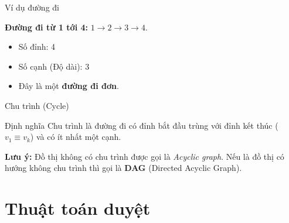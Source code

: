 \documentclass{beamer}
\begin{document}
\begin{frame}{Ví dụ đường đi}

\begin{center}

\end{center}

\pause
\textbf{Đường đi từ 1 tới 4:} $1 \to 2 \to 3 \to 4$.
\begin{itemize}
    \item Số đỉnh: 4
    \item Số cạnh (Độ dài): 3
    \item Đây là một \textbf{đường đi đơn}.
\end{itemize}

\end{frame}


\begin{frame}{Chu trình (Cycle)}

\begin{block}{Định nghĩa}
Chu trình là đường đi có đỉnh bắt đầu trùng với đỉnh kết thúc ($v_1 \equiv v_k$) và có ít nhất một cạnh.
\end{block}

\pause

\begin{center}

\end{center}

\textbf{Lưu ý:} Đồ thị không có chu trình được gọi là \textit{Acyclic graph}. Nếu là đồ thị có hướng không chu trình thì gọi là \textbf{DAG} (Directed Acyclic Graph).

\end{frame}

\section{Thuật toán duyệt}
\end{document}
